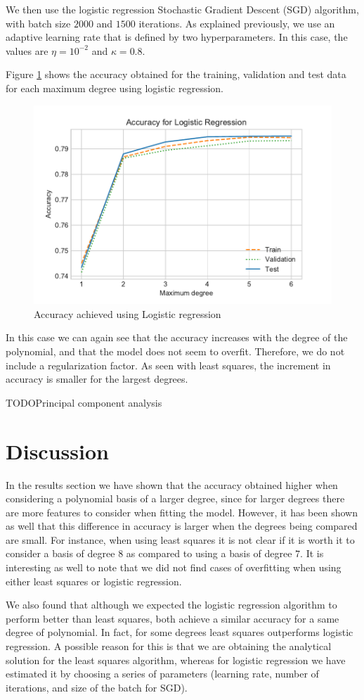 \documentclass[10pt,conference,compsocconf]{IEEEtran}
\begin{document}
    We then use the logistic regression Stochastic Gradient Descent (SGD) algorithm, with batch size $2000$ and $1500$ iterations. As explained previously, we use an adaptive learning rate that is defined by two hyperparameters. In this case, the values are $\eta = 10^{-2}$ and $\kappa = 0.8$.

    Figure \ref{fig:LRprec} shows the accuracy obtained for the training, validation and test data for each maximum degree using logistic regression.

    \begin{figure}[htp]
      \centering
      \includegraphics[width=.45\textwidth]{LRprec}
      \caption{Accuracy achieved using Logistic regression}
      \label{fig:LRprec}
    \end{figure}

    In this case we can again see that the accuracy increases with the degree of the polynomial, and that the model does not seem to overfit. Therefore, we do not include a regularization factor. As seen with least squares, the increment in accuracy is smaller for the largest degrees.

    TODOPrincipal component analysis

\section{Discussion}
\label{sec:discussion}
  In the results section we have shown that the accuracy obtained higher when considering a polynomial basis of a larger degree, since for larger degrees there are more features to consider when fitting the model. However, it has been shown as well that this difference in accuracy is larger when the degrees being compared are small. For instance, when using least squares it is not clear if it is worth it to consider a basis of degree $8$ as compared to using a basis of degree $7$. It is interesting as well to note that we did not find cases of overfitting when using either least squares or logistic regression.

  We also found that although we expected the logistic regression algorithm to perform better than least squares, both achieve a similar accuracy for a same degree of polynomial. In fact, for some degrees least squares outperforms logistic regression. A possible reason for this is that we are obtaining the analytical solution for the least squares algorithm, whereas for logistic regression we have estimated it by choosing a series of parameters (learning rate, number of iterations, and size of the batch for SGD).
\end{document}
